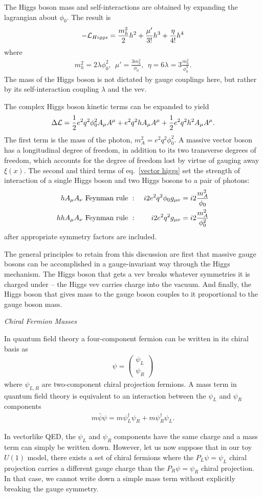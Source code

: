 \documentclass[12pt]{article}
\def\beq{\begin{eqnarray}}
\def\eeq{\end{eqnarray}}
\def\bea{\begin{eqnarray}}
\def\eea{\end{eqnarray}}
\begin{document}
The Higgs boson mass and self-interactions are obtained by expanding the lagrangian about $\phi_0$. The result is
\beq
-{\cal L}_{Higgs}=\frac{m_h^2}{2}h^2+\frac{\mu'}{3!}h^3+\frac{\eta}{4!}h^4
\eeq
where
\beq
m^2_h=2\lambda\phi^2_0,~~\mu'=\frac{3m^2_h}{\phi_0},~~\eta=6\lambda=3\frac{m^2_h}{\phi_0^2}.
\eeq
The mass of the Higgs boson is not dictated by gauge couplings here, but rather by its self-interaction coupling $\lambda$ and the vev.

The complex Higgs boson kinetic terms can be expanded to yield
\beq
\Delta {\cal L}=\frac{1}{2}e^2q^2\phi_0^2 A_\mu A^\mu+e^2q^2h A_\mu A^\mu
+\frac{1}{2}e^2q^2h^2A_\mu A^\mu.
\label{vector higgs}
\eeq
The first term is the mass of the photon, $m_A^2=e^2q^2\phi_0^2$. A massive vector boson has a longitudinal degree of freedom, in addition to its two transverse degrees of freedom,  which accounts for the degree of freedom lost by virtue of gauging away $\xi(x)$. The second and third terms of eq.~\ref{vector higgs} set the strength of interaction of a single Higgs boson and two Higgs bosons to a pair of photons:
\bea
hA_\mu A_\nu~{\rm Feynman~rule}~& : & ~ i2e^2q^2\phi_0 g_{\mu\nu} = i2\frac{m_A^2}{\phi_0}\label{hAA}\\
hhA_\mu A_\nu~{\rm Feynman~rule}~& : & ~ i2e^2q^2 g_{\mu\nu}=i2\frac{m_A^2}{\phi_0^2}
\eea
after appropriate symmetry factors are included.  


The general principles to retain from this discussion are first that massive gauge bosons can be accomplished in a gauge-invariant way through the Higgs mechanism. The Higgs boson that gets a vev breaks whatever symmetries it is charged under -- the Higgs vev carries charge into the vacuum. And finally, the Higgs boson that gives mass to the gauge boson couples to it proportional to the gauge boson mass.

\noindent
{\it Chiral Fermion Masses}


In quantum field theory a four-component fermion can be written in its chiral basis as
\beq
\psi=\left( \begin{array}{c} \psi_L \\ \psi_R \end{array}\right)
\eeq
where $\psi_{L,R}$ are two-component chiral projection fermions. A mass term in quantum field theory is equivalent to an interaction between the $\psi_L$ and $\psi_R$ components
\beq
m\bar \psi\psi = m\psi_L^\dagger\psi_R+m\psi^\dagger_R \psi_L.
\eeq

In vectorlike QED, the $\psi_L$ and $\psi_R$ components have the same charge and a mass term can simply be written down. However, let us now suppose that in our toy $U(1)$ model, there exists a set of chiral fermions where the $P_L\psi=\psi_L$ chiral projection carries a different gauge charge than the $P_R\psi=\psi_R$ chiral projection.  
In that case, we cannot write down a simple mass term without explicitly breaking the gauge symmetry.
\end{document}
